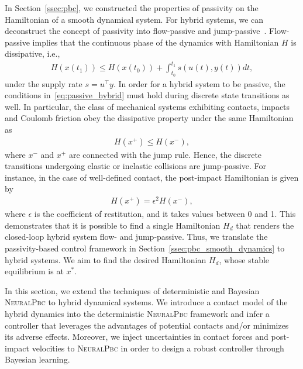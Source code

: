 %
In Section~\ref{ssec:pbc}, we constructed the properties of passivity on the
Hamiltonian of a smooth dynamical system.
%
For hybrid systems, we can deconstruct the concept of passivity into
flow-passive and jump-passive~\cite{naldi2013passivity}.
%
Flow-passive implies that the continuous phase of the dynamics with Hamiltonian
$H$ is dissipative, i.e., 
\begin{align}
    H(x(t_1)) \leq H(x(t_0)) + \int_{t_0}^{t_1} s(u(t), y(t)) dt,
    \label{eq:passive_hybrid}
\end{align}
\noindent under the supply rate $s=u^\top y$.
%
In order for a hybrid system to be passive, the conditions
in~\eqref{eq:passive_hybrid} must hold during discrete state transitions as well.
%
In particular, the class of mechanical systems exhibiting contacts, impacts and
Coulomb friction obey the dissipative property under the same Hamiltonian
as~\cite{van2007introduction}
%
\begin{align*}
    H(x^+) \leq H(x^-),
\end{align*}
%
\noindent where $x^-$ and $x^+$ are connected with the jump rule.
%
Hence, the discrete transitions undergoing elastic or inelastic collisions are
jump-passive.
%
For instance, in the case of well-defined contact, the post-impact
Hamiltonian is given by
\begin{align*}
    H(x^+) = \epsilon^2 H(x^-),
\end{align*}
\noindent where $\epsilon$ is the coefficient of restitution, and it takes
values between 0 and 1.
%
This demonstrates that it is possible to find a single Hamiltonian $H_d$ that renders 
the closed-loop hybrid system flow- and jump-passive.
%
Thus, we translate the passivity-based control framework in
Section~\ref{ssec:pbc_smooth_dynamics} to hybrid systems.
%
We aim to find the desired Hamiltonian $H_d$, whose stable equilibrium is at
$x^*$.
%

In this section, we extend the techniques of deterministic and Bayesian
\textsc{NeuralPbc} to hybrid dynamical systems.
%
We introduce a contact model of the hybrid dynamics into the deterministic
\textsc{NeuralPbc} framework and infer a controller that leverages the
advantages of potential contacts and/or minimizes its adverse effects.
%
Moreover, we inject uncertainties in contact forces and post-impact velocities
to \textsc{NeuralPbc} in order to design a robust controller through Bayesian
learning.
%


